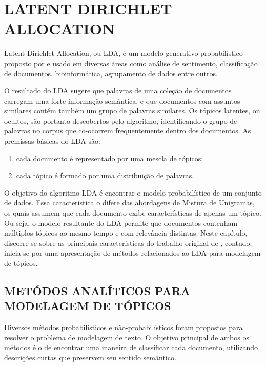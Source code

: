 \documentclass[12pt,a4paper]{article}
\begin{document}
\section{LATENT DIRICHLET ALLOCATION} \label{sec:lda}
Latent Dirichlet Allocation, ou LDA, é um modelo generativo probabilístico proposto por  e usado em diversas áreas como análise de sentimento,
 classificação de documentos, bioinformática, agrupamento de dados entre outros. 
 
 O resultado do LDA sugere que palavras de uma coleção de documentos carregam uma forte informação semântica,
 e que documentos com assuntos similares contém também um grupo de palavras similares. Os tópicos latentes, ou ocultos,
 são portanto descobertos pelo algoritmo, identificando o grupo de palavras no corpus que co-ocorrem frequentemente dentro dos documentos. As premissas  básicas do LDA são:

\begin{enumerate}
  \item cada documento é representado por uma mescla de tópicos;
  \item cada tópico é formado por uma distribuição de palavras.
\end{enumerate}

O objetivo do algoritmo LDA é encontrar o modelo probabilístico de um conjunto de dados. Essa característica o difere das abordagens de Mistura de Unigramas, os quais assumem que cada documento exibe características de apenas um tópico. Ou seja, o modelo resultante do LDA  permite que documentos contenham múltiplos tópicos ao mesmo tempo e com relevância distintas. Neste capítulo, discorre-se sobre as principais características do trabalho original de , contudo, inicia-se por uma apresentação de métodos relacionados ao LDA para modelagem de tópicos.
 


\subsection{METÓDOS ANALÍTICOS PARA MODELAGEM DE TÓPICOS} \label{sec:trabalhos-relacionados}

Diversos métodos probabilísticos e não-probabilísticos foram propostos para resolver o problema de modelagem de texto. O objetivo
 principal de ambos os métodos é o de encontrar uma maneira de classificar cada documento, utilizando descrições curtas que preservem
 seu sentido semântico.
\end{document}
